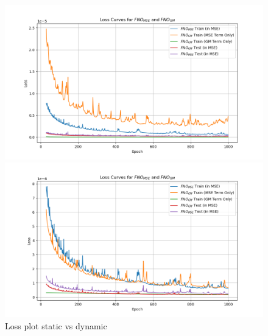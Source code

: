 \documentclass[
]{article}
\begin{document}
\begin{figure}

\begin{minipage}{0.50\linewidth}

\includegraphics[width=1\textwidth,height=\textheight]{../../test/all_loss_prev_same_eig.png}

\end{minipage}%
%
\begin{minipage}{0.50\linewidth}

\includegraphics[width=1\textwidth,height=\textheight]{../../test/all_loss.png}

\end{minipage}%

\caption{\label{fig-loss}Loss plot static vs dynamic}

\end{figure}%
\end{document}
